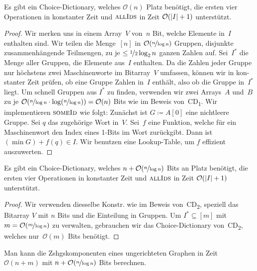 \documentclass{cheat-sheet}
\renewcommand{\O}{\mathcal{O}} %
\begin{document}
\begin{lem}[CD\textsubscript{2}]
  Es gibt ein Choice-Dictionary, welches $\O(n)$ Platz benötigt, die ersten vier Operationen in konstanter Zeit und $\Call{allIds}{}$ in Zeit $\O(\abs{I} + 1)$ unterstützt.
\end{lem}

\begin{proof}
  Wir merken uns in einem Array~$V$ von~$n$ Bit, welche Elemente in~$I$ enthalten sind.
  Wir teilen die Menge~$[n]$ in $\O(\nicefrac{n}{\log n})$ Gruppen, \dh{} disjunkte zusammenhängende Teilmengen, zu je $\leq \nicefrac{1}{2} \log_2 n$ ganzen Zahlen auf.
  Sei~$I^{*}$ die Menge aller Gruppen, die Elemente aus~$I$ enthalten.
  Da die Zahlen jeder Gruppe nur höchstens zwei Maschinenworte im Bitarray~$V$ umfassen, können wir in kon- stanter Zeit prüfen, ob eine Gruppe Zahlen in~$I$ enthält, also ob die Gruppe in~$I^{*}$ liegt.
  Um schnell Gruppen aus $I^{*}$ zu finden, verwenden wir zwei Arrays~$A$ und~$B$ zu je $\O(\nicefrac{n}{\log n} \cdot \log(\nicefrac{n}{\log n})) = \O(n)$ Bits wie im Beweis von~CD\textsubscript{1}.
  Wir implementieren $\Call{someId}{}$ wie folgt: Zunächst ist $G \coloneqq A[0]$ eine nichtleere Gruppe. Sei $q$ das zugehörige Wort in~$V$. Sei~$f$ eine Funktion, welche für ein Maschinenwort den Index eines 1-Bits im Wort zurückgibt. Dann ist $(\min G) + f(q) \in I$.
  Wir benutzen eine Lookup-Table, um $f$ effizient auszuwerten.
\end{proof}

\begin{thm}[CD\textsubscript{3}]
  Es gibt ein Choice-Dictionary, welches $n + \O(\nicefrac{n}{\log n})$ Bits an Platz benötigt, die ersten vier Operationen in konstanter Zeit und $\Call{allIds}{}$ in Zeit $\O(\abs{I} + 1)$ unterstützt.
\end{thm}

\begin{proof}
  Wir verwenden diesselbe Konstr. wie im Beweis von~CD\textsubscript{2}, speziell das Bitarray $V$ mit $n$ Bits und die Einteilung in Gruppen.
  Um $I^{*} \subseteq [m]$ mit $m = \O(\nicefrac{m}{\log n})$ zu verwalten, gebrauchen wir das Choice-Dictionary von~CD\textsubscript{2}, welches nur~$\O(m)$ Bits benötigt.
\end{proof}

\begin{kor}
  Man kann die Zshgskomponenten eines ungerichteten Graphen in Zeit $\O(n + m)$ mit $n + \O(\nicefrac{n}{\log n})$ Bits berechnen.
\end{kor}
\end{document}
